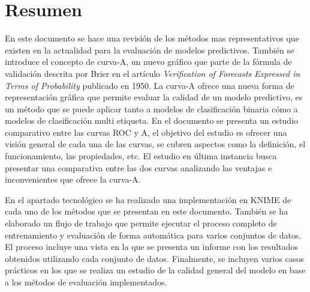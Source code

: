 \thispagestyle{empty}
\section*{Resumen}

En este documento se hace una revisión de los métodos mas representativos que existen en la actualidad para la evaluación de modelos predictivos.
También se introduce el concepto de curva-A, un nuevo gráfico que parte de la fórmula de validación descrita por Brier en el artículo \textit{Verification of Forecasts Expressed in Terms of Probability} \cite{brie_1950} publicado en 1950. La curva-A ofrece una nueva forma de representación gráfica que permite evaluar la calidad de un modelo predictivo, es un método que se puede aplicar tanto a modelos de clasificación binaria cómo a modelos de clasificación multi etiqueta. En el documento se presenta un estudio comparativo entre las curvas ROC y A, el objetivo del estudio es ofrecer una visión general de cada una de las curvas, se cubren aspectos como la definición, el funcionamiento, las propiedades, etc. El estudio en última instancia busca presentar una comparativa entre las dos curvas analizando las ventajas e inconvenientes que ofrece la curva-A.

\bigbreak

En el apartado tecnológico se ha realizado una implementación en KNIME de cada uno de los métodos que se presentan en este documento. También se ha elaborado un flujo de trabajo que permite ejecutar el proceso completo de entrenamiento y evaluación de forma automática para varios conjuntos de datos. El proceso incluye una vista en la que se presenta un informe con los resultados obtenidos utilizando cada conjunto de datos. Finalmente, se incluyen varios casos prácticos en los que se realiza un estudio de la calidad general del modelo en base a los métodos de evaluación implementados.


\clearpage